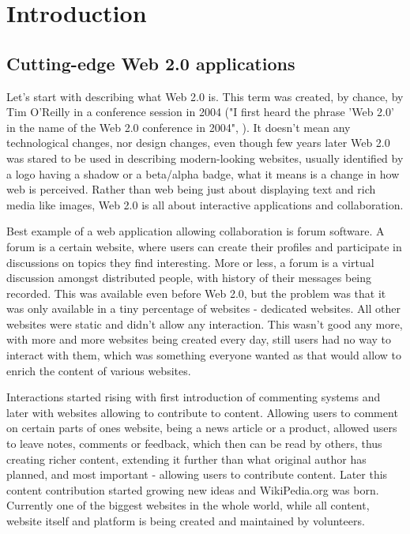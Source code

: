\chapter{Introduction}

\section{Cutting-edge Web 2.0 applications}

Let's start with describing what Web 2.0 is. This term was created, by chance, by Tim O'Reilly in a conference session in 2004 ("I first heard the phrase 'Web 2.0' in the name of the Web 2.0 conference in 2004", \citep{web20}). It doesn't mean any technological changes, nor design changes, even though few years later Web 2.0 was stared to be used in describing modern-looking websites, usually identified by a logo having a shadow or a beta/alpha badge, what it means is a change in how web is perceived. Rather than web being just about displaying text and rich media like images, Web 2.0 is all about interactive applications and collaboration. 

Best example of a web application allowing collaboration is forum software. A forum is a certain website, where users can create their profiles and participate in discussions on topics they find interesting. More or less, a forum is a virtual discussion amongst distributed people, with history of their messages being recorded. This was available even before Web 2.0, but the problem was that it was only available in a tiny percentage of websites - dedicated websites. All other websites were static and didn't allow any interaction. This wasn't good any more, with more and more websites being created every day, still users had no way to interact with them, which was something everyone wanted as that would allow to enrich the content of various websites. 

Interactions started rising with first introduction of commenting systems and later with websites allowing to contribute to content. Allowing users to comment on certain parts of ones website, being a news article or a product, allowed users to leave notes, comments or feedback, which then can be read by others, thus creating richer content, extending it further than what original author has planned, and most important - allowing users to contribute content. Later this content contribution started growing new ideas and WikiPedia.org was born\citep{wikipedia}. Currently one of the biggest websites in the whole world, while all content, website itself and platform is being created and maintained by volunteers. 

